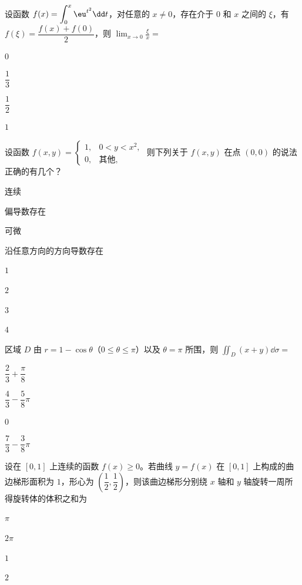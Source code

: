 
\begin{question}[index=1]
设函数 $f(x)=\displaystyle\int_0^x\eu^{t^2}\dd t$，对任意的 $x\ne0$，存在介于 $0$ 和 $x$ 之间的 $\xi$，有 $f(\xi)=\dfrac{f(x)+f(0)}2$，则 $\displaystyle\lim_{x\to0}\frac{\xi}{x}=$
\begin{choices}[columns=4]
\item $0$
\item $\dfrac13$
\item $\dfrac12$
\item $1$
\end{choices}
\end{question}
\QuestionBreak

\begin{question}[index=2]
设函数 $f(x,y)=\begin{cases}1,&0<y<x^2,\\0,&\text{其他},\end{cases}$ 则下列关于 $f(x,y)$ 在点 $(0,0)$ 的说法正确的有几个？
\par{}\quad 连续
\par{}\quad 偏导数存在
\par{}\quad 可微
\par{}\quad 沿任意方向的方向导数存在
\begin{choices}[columns=4]
\item $1$
\item $2$
\item $3$
\item $4$
\end{choices}
\end{question}
\QuestionBreak

\begin{question}[index=3]
区域 $D$ 由 $r=1-\cos\theta$（$0\le\theta\le\pi$）以及 $\theta=\pi$ 所围，则 $\displaystyle\iint_D(x+y)\dd\sigma=$
\begin{choices}[columns=4]
\item $\dfrac23+\dfrac{\pi}{8}$
\item $\dfrac43-\dfrac58\pi$
\item $0$
\item $\dfrac73-\dfrac38\pi$
\end{choices}
\end{question}
\QuestionBreak

\begin{question}[index=4]
设在 $[0,1]$ 上连续的函数 $f(x)\ge0$。若曲线 $y=f(x)$ 在 $[0,1]$ 上构成的\allowbreak\mbox{曲边梯形}面积为 $1$，形心为 $\left(\dfrac12,\dfrac12\right)$，则该\allowbreak\mbox{曲边梯形}分别绕 $x$ 轴和 $y$ 轴旋转一周所得旋转体的体积之和为
\begin{choices}[columns=4]
\item $\pi$
\item $2\pi$
\item $1$
\item $2$
\end{choices}
\end{question}
\QuestionBreak

